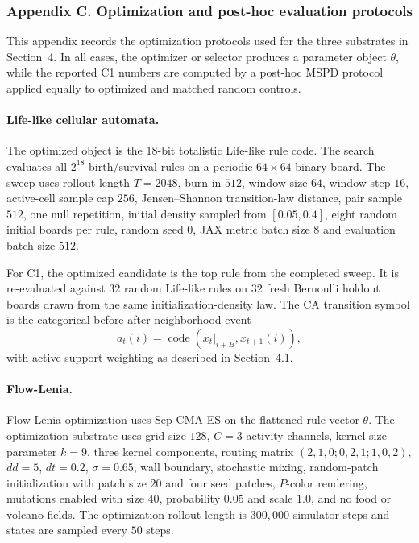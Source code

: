\subsubsection*{Appendix C. Optimization and post-hoc evaluation protocols}
\label{app:optimization-protocols}

This appendix records the optimization protocols used for the three substrates in Section~4.  In all cases, the optimizer or selector produces a parameter object $\theta$, while the reported C1 numbers are computed by a post-hoc MSPD protocol applied equally to optimized and matched random controls.

\paragraph{Life-like cellular automata.}
The optimized object is the 18-bit totalistic Life-like rule code.  The search evaluates all $2^{18}$ birth/survival rules on a periodic $64\times64$ binary board.  The sweep uses rollout length $T=2048$, burn-in $512$, window size $64$, window step $16$, active-cell sample cap $256$, Jensen--Shannon transition-law distance, pair sample $512$, one null repetition, initial density sampled from $[0.05,0.4]$, eight random initial boards per rule, random seed $0$, JAX metric batch size $8$ and evaluation batch size $512$.

For C1, the optimized candidate is the top rule from the completed sweep.  It is re-evaluated against $32$ random Life-like rules on $32$ fresh Bernoulli holdout boards drawn from the same initialization-density law.  The CA transition symbol is the categorical before-after neighborhood event
\[
  a_t(i)=\operatorname{code}(x_t|_{i+B},x_{t+1}(i)),
\]
with active-support weighting as described in Section~4.1.

\paragraph{Flow-Lenia.}
Flow-Lenia optimization uses Sep-CMA-ES on the flattened rule vector $\theta$.  The optimization substrate uses grid size $128$, $C=3$ activity channels, kernel size parameter $k=9$, three kernel components, routing matrix $(2,1,0;0,2,1;1,0,2)$, $dd=5$, $dt=0.2$, $\sigma=0.65$, wall boundary, stochastic mixing, random-patch initialization with patch size $20$ and four seed patches, $P$-color rendering, mutations enabled with size $40$, probability $0.05$ and scale $1.0$, and no food or volcano fields.  The optimization rollout length is $300{,}000$ simulator steps and states are sampled every $50$ steps.

